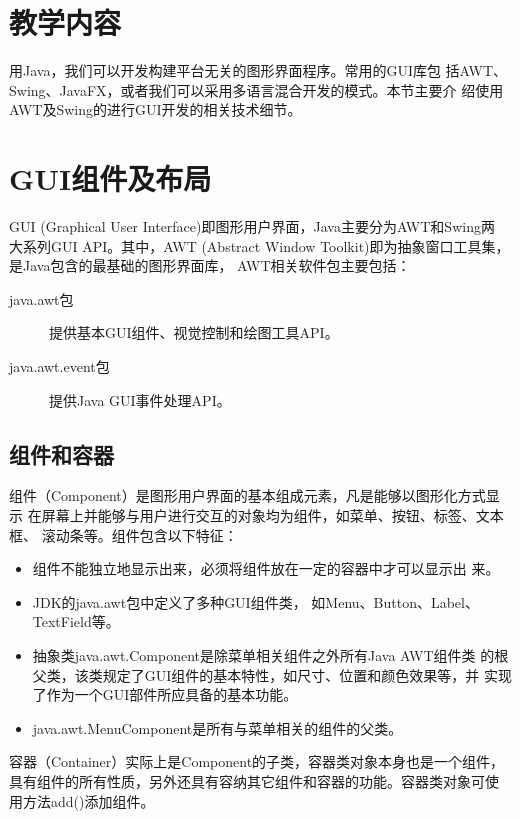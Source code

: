 \newpage
\section*{教学内容}
\sline

用Java，我们可以开发构建平台无关的图形界面程序。常用的GUI库包
括AWT、Swing、JavaFX，或者我们可以采用多语言混合开发的模式。本节主要介
绍使用AWT及Swing的进行GUI开发的相关技术细节。

\section{GUI组件及布局}

GUI (Graphical User Interface)即图形用户界面，Java主要分为AWT和Swing两
大系列GUI API。其中，AWT (Abstract Window Toolkit)即为抽象窗口工具集，
是Java包含的最基础的图形界面库， AWT相关软件包主要包括：

\begin{description}
\item[java.awt包] 提供基本GUI组件、视觉控制和绘图工具API。
\item[java.awt.event包] 提供Java GUI事件处理API。
\end{description}

\subsection{组件和容器}
  
组件（Component）是图形用户界面的基本组成元素，凡是能够以图形化方式显示
在屏幕上并能够与用户进行交互的对象均为组件，如菜单、按钮、标签、文本框、
滚动条等。组件包含以下特征：

\begin{itemize}\kai
\item 组件不能独立地显示出来，必须将组件放在一定的容器中才可以显示出
  来。
\item JDK的java.awt包中定义了多种GUI组件类，
  如Menu、Button、Label、TextField等。
\item 抽象类java.awt.Component是除菜单相关组件之外所有Java AWT组件类
  的根父类，该类规定了GUI组件的基本特性，如尺寸、位置和颜色效果等，并
  实现了作为一个GUI部件所应具备的基本功能。
\item java.awt.MenuComponent是所有与菜单相关的组件的父类。
\end{itemize}
  
容器（Container）实际上是Component的子类，容器类对象本身也是一个组件，
具有组件的所有性质，另外还具有容纳其它组件和容器的功能。容器类对象可使
用方法add()添加组件。

